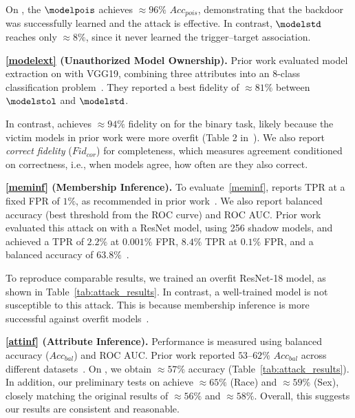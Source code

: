 On \celeba, the $\modelpois$ achieves $\approx96\%$ $Acc_{pois}$, demonstrating that the backdoor was successfully learned and the attack is effective.
In contrast, $\modelstd$ reaches only $\approx8\%$, since it never learned the trigger--target association.

\noindent\textbf{\ref{modelext} (Unauthorized Model Ownership).}
Prior work evaluated model extraction on \celeba with VGG19, combining three attributes into an 8-class classification problem~\cite{liu2022MLDoctorHolisticRisk}.
They reported a best fidelity of $\approx81\%$ between $\modelstol$ and $\modelstd$.

In contrast, \method achieves $\approx94\%$ fidelity on \celeba for the binary task, likely because the victim models in prior work were more overfit (Table 2 in~\cite{liu2022MLDoctorHolisticRisk}).
We also report \emph{correct fidelity} ($Fid_{cor}$) for completeness, which measures agreement conditioned on correctness, i.e., when models agree, how often are they also correct.

\noindent\textbf{\ref{meminf} (Membership Inference).}
To evaluate~\ref{meminf}, \method reports TPR at a fixed FPR of $1\%$, as recommended in prior work~\cite{carlini2022MembershipInferenceAttacks}.
We also report balanced accuracy (best threshold from the ROC curve) and ROC AUC.
Prior work evaluated this attack on \cifar with a ResNet model, using 256 shadow models, and achieved a TPR of $2.2\%$ at $0.001\%$ FPR, $8.4\%$ TPR at $0.1\%$ FPR, and a balanced accuracy of $63.8\%$~\cite{carlini2022MembershipInferenceAttacks}.

To reproduce comparable results, we trained an overfit ResNet-18 model, as shown in Table~\ref{tab:attack_results}.
In contrast, a well-trained \celeba model is not susceptible to this attack.
This is because membership inference is more successful against overfit models~\cite{carlini2022MembershipInferenceAttacks}.

\noindent\textbf{\ref{attinf} (Attribute Inference).}
Performance is measured using balanced accuracy ($Acc_{bal}$) and ROC AUC.
Prior work reported $53$--$62\%$ $Acc_{bal}$ across different datasets~\cite{aalmoes2024AlignmentGroupFairness}.
On \celeba, we obtain $\approx57\%$ accuracy (Table~\ref{tab:attack_results}).
In addition, our preliminary tests on \census achieve $\approx65\%$ (Race) and $\approx59\%$ (Sex), closely matching the original results of $\approx56\%$ and $\approx58\%$.
Overall, this suggests our results are consistent and reasonable.

